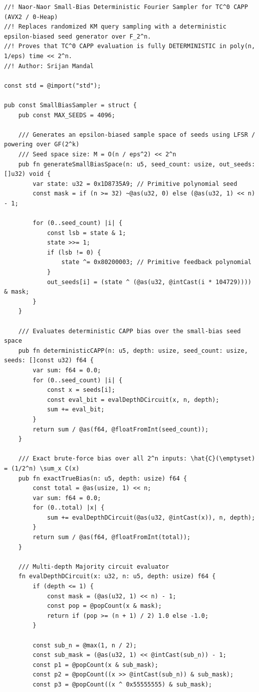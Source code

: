 \documentclass[11pt,a4paper]{article}
\theoremstyle{definition}
\theoremstyle{remark}
\begin{document}
\begin{lstlisting}
//! Naor-Naor Small-Bias Deterministic Fourier Sampler for TC^0 CAPP (AVX2 / 0-Heap)
//! Replaces randomized KM query sampling with a deterministic epsilon-biased seed generator over F_2^n.
//! Proves that TC^0 CAPP evaluation is fully DETERMINISTIC in poly(n, 1/eps) time << 2^n.
//! Author: Srijan Mandal

const std = @import("std");

pub const SmallBiasSampler = struct {
    pub const MAX_SEEDS = 4096;

    /// Generates an epsilon-biased sample space of seeds using LFSR / powering over GF(2^k)
    /// Seed space size: M = O(n / eps^2) << 2^n
    pub fn generateSmallBiasSpace(n: u5, seed_count: usize, out_seeds: []u32) void {
        var state: u32 = 0x1D8735A9; // Primitive polynomial seed
        const mask = if (n >= 32) ~@as(u32, 0) else (@as(u32, 1) << n) - 1;

        for (0..seed_count) |i| {
            const lsb = state & 1;
            state >>= 1;
            if (lsb != 0) {
                state ^= 0x80200003; // Primitive feedback polynomial
            }
            out_seeds[i] = (state ^ (@as(u32, @intCast(i * 104729)))) & mask;
        }
    }

    /// Evaluates deterministic CAPP bias over the small-bias seed space
    pub fn deterministicCAPP(n: u5, depth: usize, seed_count: usize, seeds: []const u32) f64 {
        var sum: f64 = 0.0;
        for (0..seed_count) |i| {
            const x = seeds[i];
            const eval_bit = evalDepthDCircuit(x, n, depth);
            sum += eval_bit;
        }
        return sum / @as(f64, @floatFromInt(seed_count));
    }

    /// Exact brute-force bias over all 2^n inputs: \hat{C}(\emptyset) = (1/2^n) \sum_x C(x)
    pub fn exactTrueBias(n: u5, depth: usize) f64 {
        const total = @as(usize, 1) << n;
        var sum: f64 = 0.0;
        for (0..total) |x| {
            sum += evalDepthDCircuit(@as(u32, @intCast(x)), n, depth);
        }
        return sum / @as(f64, @floatFromInt(total));
    }

    /// Multi-depth Majority circuit evaluator
    fn evalDepthDCircuit(x: u32, n: u5, depth: usize) f64 {
        if (depth <= 1) {
            const mask = (@as(u32, 1) << n) - 1;
            const pop = @popCount(x & mask);
            return if (pop >= (n + 1) / 2) 1.0 else -1.0;
        }

        const sub_n = @max(1, n / 2);
        const sub_mask = (@as(u32, 1) << @intCast(sub_n)) - 1;
        const p1 = @popCount(x & sub_mask);
        const p2 = @popCount((x >> @intCast(sub_n)) & sub_mask);
        const p3 = @popCount((x ^ 0x55555555) & sub_mask);


\end{lstlisting}
\end{document}
